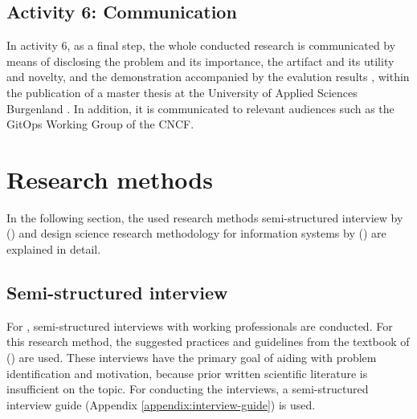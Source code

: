\subsection{Activity 6: Communication}
\label{methodology:activity6}

\noindent
In activity 6, as a final step,
the whole conducted research is communicated by means of
disclosing
the problem and its importance,
the artifact and its utility and novelty,
and the demonstration accompanied by the evalution results
\autocite{designScienceResearchMethodologyForInformationSystemsResearch},
within the publication of a master thesis at
the University of Applied Sciences Burgenland \autocite{fhBurgenlandWebsite}.
In addition, it is communicated to relevant audiences such as
the GitOps Working Group \autocite{gitopsWG} of the CNCF.






\section{Research methods}

In the following section,
the used research methods
semi-structured interview
by
\citeauthor{glaser2010experteninterviews} (\citeyear{glaser2010experteninterviews})
and
design science research methodology for information systems
by
\citeauthor{designScienceResearchMethodologyForInformationSystemsResearch} (\citeyear{designScienceResearchMethodologyForInformationSystemsResearch})
are explained in detail.




\subsection{Semi-structured interview}\label{methodology:interview}

For ,
semi-structured interviews with working professionals
are conducted.
For this research method,
the suggested practices and guidelines from
the textbook of
\citeauthor{glaser2010experteninterviews} (\citeyear{glaser2010experteninterviews})
are used.
These interviews have the primary goal of aiding with
problem identification and motivation,
because prior written scientific literature is insufficient on the topic.
For conducting the interviews,
a semi-structured interview guide (Appendix \ref{appendix:interview-guide}) is used.

